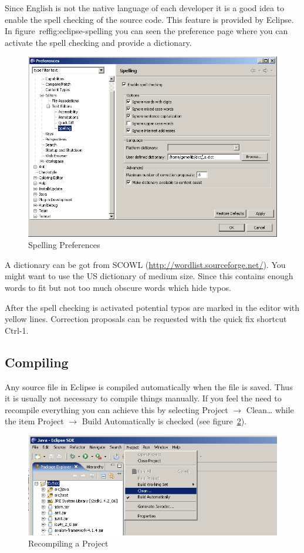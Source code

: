 \documentclass{extex-doc}
\newcommand\menu{\textsf}
\newcommand\sub{\(\rightarrow\) }
\begin{document}
Since English is not the native language of each developer it is a
good idea to enable the spell checking of the source code. This
feature is provided by Eclipse. In figure~ref{fig:eclipse-spelling}
you can seen the preference page where you can activate the spell
checking and provide a dictionary.
\begin{figure}[htp]
  \centering
  \includegraphics[scale=.4]{image/spelling}
  \caption{Spelling Preferences}\label{fig:eclipse-spelling}
\end{figure}

A dictionary can be got from SCOWL
(\url{http://wordlist.sourceforge.net/}). You might want to use the US
dictionary of medium size. Since this contains enough words to fit but
not too much obscure words which hide typos.

After the spell checking is activated potential typos are marked in
the editor with yellow lines. Correction proposals can be requested
with the quick fix shortcut Ctrl-1.


\subsection{Compiling \ExTeX}

Any source file in Eclipse is compiled automatically when the file is
saved. Thus it is usually not necessary to compile things manually. If
you feel the need to recompile everything you can achieve this by
selecting \menu{Project \sub Clean\ldots} while the item \menu{Project
  \sub Build Automatically} is checked (see
figure~\ref{fig:eclipse-recompile}).
\begin{figure}[thp]
  \centering
  \includegraphics[scale=.4]{image/eclipse-recompile}
  \caption{Recompiling a Project}\label{fig:eclipse-recompile}
\end{figure}
\end{document}
